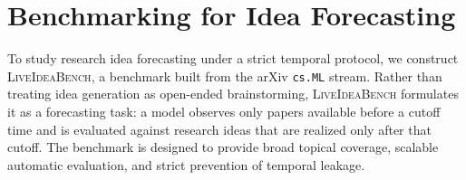 \documentclass{article} %
\begin{document}







\section{Benchmarking for Idea Forecasting}

To study research idea forecasting under a strict temporal protocol, we construct \textsc{LiveIdeaBench}, a benchmark built from the arXiv \texttt{cs.ML} stream. Rather than treating idea generation as open-ended brainstorming, \textsc{LiveIdeaBench} formulates it as a forecasting task: a model observes only papers available before a cutoff time and is evaluated against research ideas that are realized only after that cutoff. The benchmark is designed to provide broad topical coverage, scalable automatic evaluation, and strict prevention of temporal leakage.
\end{document}
